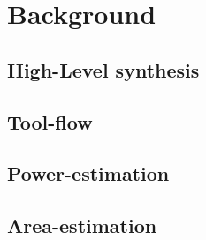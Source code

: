 \chapter{Background}
\label{chp:background} 

\section{High-Level synthesis}

\section{Tool-flow}

\section{Power-estimation}

\section{Area-estimation}